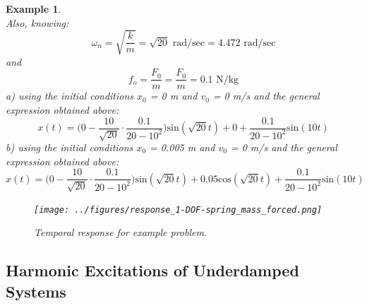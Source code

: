 \documentclass[12pt,letter]{article}
\newtheorem{ex}{Example}
\numberwithin{ex}{section} %
\newenvironment{example}{\begin{mdframed}[middlelinewidth=0.5mm]\begin{ex}\normalfont}{\end{ex}\end{mdframed}}
\numberwithin{re}{section} %
\numberwithin{pr}{section} %
\begin{document}
\begin{example}
\begin{equation}
			\end{equation}								
			Also, knowing:
			\begin{equation}
				\omega_n = \sqrt{\frac{k}{m}} = \sqrt{20} \text{ rad/sec} =  4.472 \text{ rad/sec}
			\end{equation}				
			and
			\begin{equation}
				f_o = \frac{F_0}{m} = \frac{F_0}{m} = 0.1 \text{ N/kg}
			\end{equation}	
			a) using the initial conditions $x_0$ = 0 m and $v_0$ = 0 m/s and the general expression obtained above:
			\begin{equation}
				x(t) = \Big(0-\frac{10}{\sqrt{20}}\cdot \frac{0.1}{20-10^2}\Big)\text{sin}(\sqrt{20} t) + 0 + \frac{0.1}{20-10^2}\text{sin}(10 t)
			\end{equation}			
			b) using the initial conditions $x_0$ = 0.005 m and $v_0$ = 0 m/s and the general expression obtained above:
			\begin{equation}
				x(t) = \Big(0-\frac{10}{\sqrt{20}}\cdot \frac{0.1}{20-10^2}\Big)\text{sin}(\sqrt{20} t) + 0.05\text{cos}(\sqrt{20} t) + \frac{0.1}{20-10^2}\text{sin}(10 t)
			\end{equation}			
			\begin{figure}[H]
				\centering
				\texttt{[image: ../figures/response\_1-DOF-spring\_mass\_forced.png]}
				\caption{Temporal response for example problem.}
			\end{figure}
\end{example}


	
		\subsection{Harmonic Excitations of Underdamped Systems}
\end{document}
